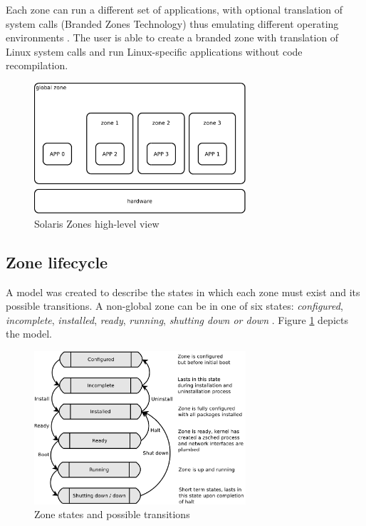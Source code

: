 \documentclass[11pt]{book}
\begin{document}
        Each zone can run a different set of applications, with optional translation of system calls (Branded Zones
        Technology) thus emulating different operating environments \cite{sag}. The user is able to create a branded
        zone with translation of Linux system calls and run Linux-specific applications without code recompilation.

        \begin{figure}[H]
          \begin{center}
            \includegraphics[width=0.7\textwidth]{img/solaris/zones-high-level.pdf}
          \end{center}

          \caption{Solaris Zones high-level view}
        \end{figure}


      \subsection{Zone lifecycle}
      \label{sub:}

        A model was created to describe the states in which each zone must exist and its possible transitions. A non-global zone can be
        in one of six states: \textit{configured}, \textit{incomplete}, \textit{installed}, \textit{ready},
        \textit{running}, \textit{shutting down or down} \cite{sag}. Figure \ref{fig:sol:lifecycle} depicts the model.

        \begin{figure}[H]
          \begin{center}
            \includegraphics[width=0.7\textwidth]{img/solaris/zone_states.pdf}
          \end{center}

          \caption{Zone states and possible transitions}
          \label{fig:sol:lifecycle}
        \end{figure}
\end{document}
